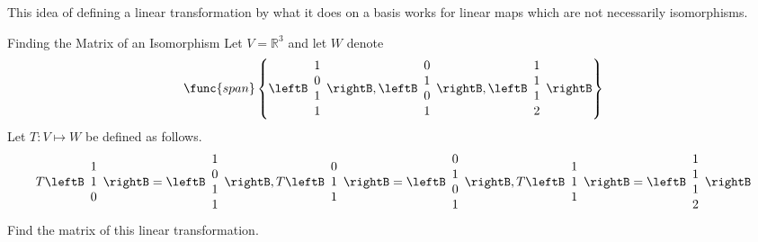 This idea of defining a linear transformation by what it does on a basis
works for linear maps which are not necessarily isomorphisms.

\begin{example}{Finding the Matrix of an Isomorphism}
Let $V=\mathbb{R}^{3}$ and let $W$ denote 
\begin{equation*}
\func{span}\left\{ \leftB
\begin{array}{c}
1 \\ 
0 \\ 
1 \\ 
1
\end{array}
\rightB ,\leftB 
\begin{array}{c}
0 \\ 
1 \\ 
0 \\ 
1
\end{array}
\rightB ,\leftB 
\begin{array}{c}
1 \\ 
1 \\ 
1 \\ 
2
\end{array}
\rightB \right\}
\end{equation*}
Let $T: V \mapsto W$ be defined as follows. 
\begin{equation*}
T\leftB 
\begin{array}{c}
1 \\ 
1 \\ 
0
\end{array}
\rightB = \leftB 
\begin{array}{c}
1 \\ 
0 \\ 
1 \\ 
1
\end{array}
\rightB ,T\leftB 
\begin{array}{c}
0 \\ 
1 \\ 
1
\end{array}
\rightB =\leftB 
\begin{array}{c}
0 \\ 
1 \\ 
0 \\ 
1
\end{array}
\rightB ,T\leftB 
\begin{array}{c}
1 \\ 
1 \\ 
1
\end{array}
\rightB =\leftB 
\begin{array}{c}
1 \\ 
1 \\ 
1 \\ 
2
\end{array}
\rightB
\end{equation*}
 Find the matrix of this linear transformation.
\end{example}

